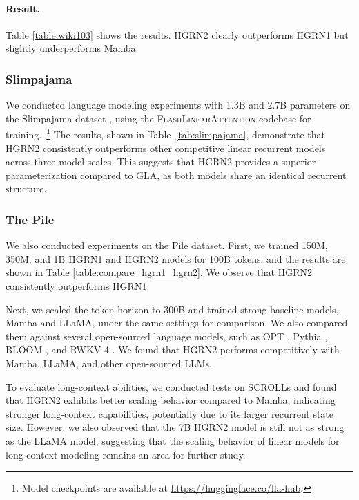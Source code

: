 \paragraph{Result.} Table \ref{table:wiki103} shows the results. HGRN2 clearly outperforms HGRN1 but slightly underperforms Mamba.
\subsubsection{Slimpajama}
We conducted language modeling experiments with 1.3B and 2.7B parameters on the Slimpajama dataset \citep{cerebras2023slimpajama}, using the \textsc{FlashLinearAttention} \citep{Yang_FLA_A_Triton-Based_2024} codebase for training.~\footnote{Model checkpoints are available at \url{https://huggingface.co/fla-hub}.} The results, shown in Table~\ref{tab:slimpajama}, demonstrate that HGRN2 consistently outperforms other competitive linear recurrent models across three model scales. This suggests that HGRN2 provides a superior parameterization compared to GLA, as both models share an identical recurrent structure.

\subsubsection{The Pile}

We also conducted experiments on the Pile dataset. First, we trained 150M, 350M, and 1B HGRN1 and HGRN2 models for 100B tokens, and the results are shown in Table \ref{table:compare_hgrn1_hgrn2}. We observe that HGRN2 consistently outperforms HGRN1.

Next, we scaled the token horizon to 300B and trained strong baseline models, Mamba and LLaMA, under the same settings for comparison. We also compared them against several open-sourced language models, such as OPT \citep{Zhang2022OPTOP}, Pythia \citep{Biderman2023PythiaAS}, BLOOM \citep{Scao2022BLOOMA1}, and RWKV-4 \citep{rwkv}. We found that HGRN2 performs competitively with Mamba, LLaMA, and other open-sourced LLMs.

To evaluate long-context abilities, we conducted tests on SCROLLs \citep{shaham-etal-2022-scrolls} and found that HGRN2 exhibits better scaling behavior compared to Mamba, indicating stronger long-context capabilities, potentially due to its larger recurrent state size. However, we also observed that the 7B HGRN2 model is still not as strong as the LLaMA model, suggesting that the scaling behavior of linear models for long-context modeling remains an area for further study.

